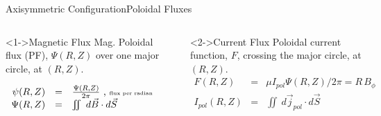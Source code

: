 \documentclass{beamer}
\begin{document}
\begin{frame}{Axisymmetric Configuration}{Poloidal Fluxes}
\begin{columns}
	\begin{block}<1->{Magnetic Flux}
	   Mag. Poloidal flux (PF),  {  $\Psi (R,Z) $} over one major
	   circle, at $(R, Z)$.

		{\small $ \begin{array}{rcl}
	    		\psi (R,Z) &=& \frac{\Psi (R,Z)}{ 2 \pi}    \textrm{ , \tiny flux per radian } \\
			\Psi (R,Z) &=& \iint \ d \vec{B} \cdot d  \vec{S}
	   		\end{array}$ }
	\end{block}
	\pause
	\begin{center}
	\includegraphics[height=2.5 cm ]{magflux.png}
	\end{center}


	\begin{block}<2->{Current Flux}
	  Poloidal current function, {   $F$},   crossing the major circle, at $(R,Z)$.
		\small
	     $ \begin{array}{rcl}
	    		F (R,Z) &=& \mu I_{pol} \Psi (R,Z) / 2 \pi  = R\, B_{\phi}  \\
			I_{pol}  (R,Z) &=& \iint \ d \vec{j}_{pol} \cdot d  \vec{S}
	   	\end{array} $
	\end{block}

	 {\begin{center}
	\includegraphics[height=2.5 cm]{currflux.png}
	\end{center}
	}

\end{columns}
\end{frame}
\end{document}
